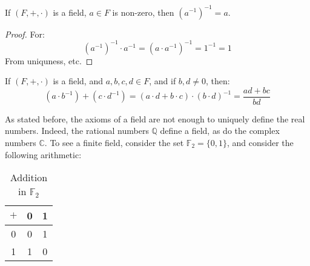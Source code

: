             \begin{theorem}
                If $(F,+,\cdot)$ is a field, $a\in{F}$ is non-zero,
                then $(a^{\minus{1}})^{\minus{1}}=a$.
            \end{theorem}
            \begin{proof}
                For:
                \begin{equation}
                    (a^{\minus{1}})^{\minus{1}}\cdot{a}^{\minus{1}}=
                    (a\cdot{a}^{\minus{1}})^{\minus{1}}=
                    1^{\minus{1}}=1
                \end{equation}
                From uniquness, etc.
            \end{proof}
            \begin{theorem}
                If $(F,+,\cdot)$ is a field, and $a,b,c,d\in{F}$, and
                if $b,d\ne{0}$, then:
                \begin{equation}
                    (a\cdot{b}^{\minus{1}})+(c\cdot{d}^{\minus{1}})=
                    (a\cdot{d}+b\cdot{c})\cdot(b\cdot{d})^{\minus{1}}
                    =\frac{ad+bc}{bd}
                \end{equation}
            \end{theorem}
            As stated before, the axioms of a field are not enough
            to uniquely define the real numbers. Indeed, the rational
            numbers $\mathbb{Q}$ define a field, as do the complex
            numbers $\mathbb{C}$. To see a finite field, consider the
            set $\mathbb{F}_{2}=\{0,1\}$, and consider the following
            arithmetic:
            \par
            \begin{minipage}[b]{0.49\textwidth}
                \centering
                \begin{table}[H]
                    \centering
                    \captionsetup{type=table}
                    \begin{tabular}{c|cc}
                        $+$&0&1\\
                        \hline
                        0&0&1\\
                        1&1&0
                    \end{tabular}
                    \caption{Addition in $\mathbb{F}_{2}$}
                    \label{tab:Real_Analysis_Add_in_F_2_Field}
                \end{table}
            \end{minipage}
